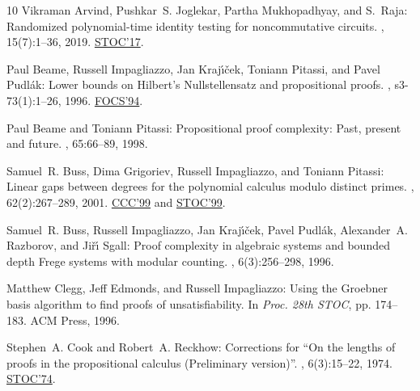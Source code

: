 \documentclass[11pt]{article}
\numberwithin{equation}{section}
\theoremstyle{definition}
\theoremstyle{plain}
\begin{document}
\begin{thebibliography}{10}
{\sc Vikraman Arvind, Pushkar~S. Joglekar, Partha Mukhopadhyay, and S.~Raja}:
  Randomized polynomial-time identity testing for noncommutative circuits.
, 15(7):1--36, 2019.
\newblock \prelim \href{http://doi.org/10.1145/3055399.3055442}{STOC'17}.

{\sc Paul Beame, Russell Impagliazzo, Jan Kraj{\'{\i}}{\v{c}}ek, Toniann
  Pitassi, and Pavel Pudl{\'a}k}: Lower bounds on {H}ilbert's {N}ullstellensatz
  and propositional proofs.
, s3-73(1):1--26, 1996.
\newblock \prelim \href{https://doi.org/10.1109/SFCS.1994.365714}{FOCS'94}.

{\sc Paul Beame and Toniann Pitassi}: Propositional proof complexity: Past,
  present and future.
, 65:66--89, 1998.

{\sc Samuel~R. Buss, Dima Grigoriev, Russell Impagliazzo, and Toniann Pitassi}:
  Linear gaps between degrees for the polynomial calculus modulo distinct
  primes.
, 62(2):267--289, 2001.
\newblock \prelims \href{https://doi.org/10.1109/CCC.1999.766254}{CCC'99} and
  \href{https://doi.org/10.1145/301250.301399}{STOC'99}.

{\sc Samuel~R. Buss, Russell Impagliazzo, Jan Kraj{\'{\i}}{\v{c}}ek, Pavel
  Pudl{\'{a}}k, Alexander~A. Razborov, and Ji{\v{r}}{\'{\i}} Sgall}: Proof
  complexity in algebraic systems and bounded depth {F}rege systems with
  modular counting.
, 6(3):256--298, 1996.
\newblock [\epfmtdoi{10.1007/BF01294258}]

{\sc Matthew Clegg, Jeff Edmonds, and Russell Impagliazzo}: Using the
  {G}roebner basis algorithm to find proofs of unsatisfiability.
\newblock In {\em Proc. 28th STOC}, pp. 174--183. ACM Press, 1996.
\newblock [\epfmtdoi{10.1145/237814.237860}]

{\sc Stephen~A. Cook and Robert~A. Reckhow}: Corrections for ``{O}n the lengths
  of proofs in the propositional calculus ({P}reliminary version)''.
, 6(3):15--22, 1974.
\newblock \prelim \href{https://doi.org/10.1145/800119.803893}{STOC'74}.
\newblock [\epfmtdoi{10.1145/1008311.1008313}]


\end{thebibliography}
\end{document}
